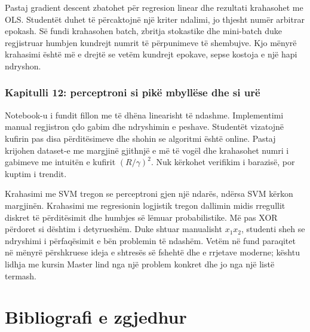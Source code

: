 \documentclass[12pt,a4paper,oneside]{book}
\begin{document}
Pastaj gradient descent zbatohet për regresion linear dhe rezultati krahasohet me OLS. Studentët duhet të përcaktojnë një kriter ndalimi, jo thjesht numër arbitrar epokash. Së fundi krahasohen batch, zbritja stokastike dhe mini-batch duke regjistruar humbjen kundrejt numrit të përpunimeve të shembujve. Kjo mënyrë krahasimi është më e drejtë se vetëm kundrejt epokave, sepse kostoja e një hapi ndryshon.

\subsection*{Kapitulli 12: perceptroni si pikë mbyllëse dhe si urë}
Notebook-u i fundit fillon me të dhëna linearisht të ndashme. Implementimi manual regjistron çdo gabim dhe ndryshimin e peshave. Studentët vizatojnë kufirin pas disa përditësimeve dhe shohin se algoritmi është online. Pastaj krijohen dataset-e me margjinë gjithnjë e më të vogël dhe krahasohet numri i gabimeve me intuitën e kufirit $(R/\gamma)^2$. Nuk kërkohet verifikim i barazisë, por kuptim i trendit.

Krahasimi me SVM tregon se perceptroni gjen një ndarës, ndërsa SVM kërkon margjinën. Krahasimi me regresionin logjistik tregon dallimin midis rregullit diskret të përditësimit dhe humbjes së lëmuar probabilistike. Më pas XOR përdoret si dështim i detyrueshëm. Duke shtuar manualisht $x_1x_2$, studenti sheh se ndryshimi i përfaqësimit e bën problemin të ndashëm. Vetëm në fund paraqitet në mënyrë përshkruese ideja e shtresës së fshehtë dhe e rrjetave moderne; kështu lidhja me kursin Master lind nga një problem konkret dhe jo nga një listë termash.

\chapter[Bibliografi]{Bibliografi e zgjedhur}
\end{document}
